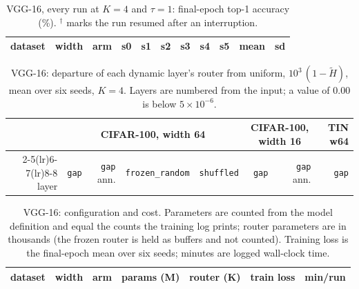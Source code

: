 \documentclass[10pt,a4paper]{article}
\begin{document}
\begin{table}[h]\centering\scriptsize
\caption{VGG-16, every run at $K=4$ and $\tau=1$: final-epoch top-1
accuracy (\si{\percent}). $^\dagger$ marks the run resumed after an
interruption.}
\label{tab:vgallruns}
\begin{tabular}{l r l rrrrrr rr}
\toprule
dataset & width & arm & s0 & s1 & s2 & s3 & s4 & s5 & mean & sd \\
\midrule
\bottomrule
\end{tabular}
\end{table}

\begin{table}[h]\centering\small
\caption{VGG-16: paired comparisons against \texttt{static}, $n=6$.}
\label{tab:vgvsstatic}
\end{table}

\begin{table}[h]\centering\small
\caption{VGG-16: departure of each dynamic layer's router from uniform,
$10^3\,(1-\tilde H)$, mean over six seeds, $K=4$. Layers are numbered from
the input; a value of 0.00 is below $5\times10^{-6}$.}
\label{tab:vglayer}
\begin{tabular}{r rrrr rr r}
\toprule
& \multicolumn{4}{c}{CIFAR-100, width 64} & \multicolumn{2}{c}{CIFAR-100, width 16} & TIN w64 \\
\cmidrule(lr){2-5}\cmidrule(lr){6-7}\cmidrule(lr){8-8}
layer & \texttt{gap} & \texttt{gap} ann. & \texttt{frozen\_random} & \texttt{shuffled} & \texttt{gap} & \texttt{gap} ann. & \texttt{gap} \\
\midrule
\bottomrule
\end{tabular}
\end{table}

\begin{table}[h]\centering\small
\caption{VGG-16: configuration and cost. Parameters are counted from the
model definition and equal the counts the training log prints; router
parameters are in thousands (the frozen router is held as buffers and not
counted). Training loss is the final-epoch mean over six seeds; minutes
are logged wall-clock time.}
\label{tab:vgconfig}
\begin{tabular}{l r l rr r r}
\toprule
dataset & width & arm & params (M) & router (K) & train loss & min/run \\
\midrule
\bottomrule
\end{tabular}
\end{table}
\end{document}
